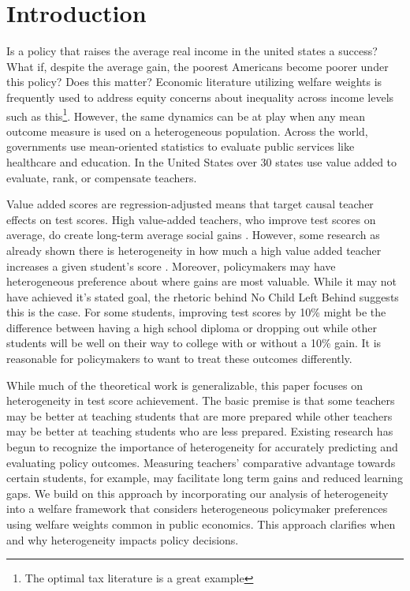 \documentclass[12pt]{article}
\theoremstyle{definition}
\theoremstyle{definition}
\theoremstyle{definition}
\theoremstyle{definition}
\begin{document}
\vfill
\pagebreak

\onehalfspacing
\section{Introduction}

    Is a policy that raises the average real income in the united states a success? What if, despite the average gain, the poorest Americans become poorer under this policy? Does this matter? Economic literature utilizing welfare weights is frequently used to address equity concerns about inequality across income levels such as this\footnote{The optimal tax literature is a great example}. However, the same dynamics can be at play when any mean outcome measure is used on a heterogeneous population.  
    Across the world, governments use mean-oriented statistics to evaluate public services like healthcare and education. In the United States over 30 states use value added to evaluate, rank, or compensate teachers. 
    
    Value added scores are regression-adjusted means that target causal teacher effects on test scores.  High value-added teachers, who improve test scores on average, do create long-term average social gains \citep[e.g.,][]{chetty2014measuring2,pope2017multidimensional}. However, some research as already shown there is heterogeneity in how much a high value added teacher increases a given student's score \citep[as in][etc.]{Delgado2020,bates2022teacher}. Moreover, policymakers may have heterogeneous preference about where gains are most valuable. While it may not have achieved it's stated goal, the rhetoric behind No Child Left Behind suggests this is the case. For some students, improving test scores by 10\% might be the difference between having a high school diploma or dropping out while other students will be well on their way to college with or without a 10\% gain. It is reasonable for policymakers to want to treat these outcomes differently. 

    While much of the theoretical work is generalizable, this paper focuses on heterogeneity in test score achievement. The basic premise is that some teachers may be better at teaching students that are more prepared while other teachers may be better at teaching students who are less prepared. Existing research has begun to recognize the importance of heterogeneity for accurately predicting and evaluating policy outcomes.  Measuring teachers' comparative advantage towards certain students, for example, may facilitate long term gains and reduced learning gaps. We build on this approach by incorporating our analysis of heterogeneity into a welfare framework that considers heterogeneous policymaker preferences using welfare weights common in public economics. This approach clarifies when and why heterogeneity impacts policy decisions.
    
\end{document}
